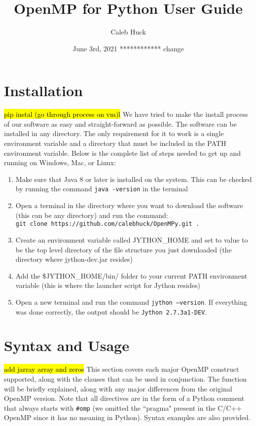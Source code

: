 \documentclass[letterpaper,12pt]{article} %
\begin{document}
\title{\Large{\textbf{OpenMP for Python User Guide}}}
\author{Caleb Huck}
\date{June 3rd, 2021 ************ change}
\maketitle

\section{Installation}
\hl{pip instal (go through process on vm)l}
We have tried to make the install process of our software as easy and straight-forward as possible. The software can be installed in any directory. The only requirement for it to work is a single environment variable and a directory that must be included in the PATH environment variable. Below is the complete list of steps needed to get up and running on Windows, Mac, or Linux:
\begin{enumerate}
\item Make sure that Java 8 or later is installed on the system. This can be checked by running the command \texttt{java -version} in the terminal
\item Open a terminal in the directory where you want to download the software (this can be any directory) and run the command: \\ \texttt{git clone https://github.com/calebhuck/OpenMPy.git .}
\item Create an environment variable called JYTHON\_HOME and set to value to be the top level directory of the file structure you just downloaded (the directory where jython-dev.jar resides)
\item Add the \$JYTHON\_HOME/bin/ folder to your current PATH environment variable (this is where the launcher script for Jython resides)
\item Open a new terminal and run the command \texttt{jython --version}. If everything was done correctly, the output should be \texttt{Jython 2.7.3a1-DEV}. 
\end{enumerate}

\section{Syntax and Usage}
\hl{add jarray array and zeros}
This section covers each major OpenMP construct supported, along with the clauses that can be used in conjunction. The function will be briefly explained, along with any major differences from the original OpenMP version. Note that all directives are in the form of a Python comment that always starts with \texttt{\#omp} (we omitted the ``pragma" present in the C/C++ OpenMP since it has no meaning in Python). Syntax examples are also provided.
\end{document}
